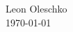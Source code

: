 \documentclass[aspectratio=169, 14pt]{beamer}
\author{Leon Oleschko}
\date{\today}
\begin{document}
\begin{frame}
	\large
	\markieren{}{}{}{}
	
	\vfill
	\normalsize
	Leon Oleschko\\
	\today
	
	\vfill
\end{frame}



\end{document}
